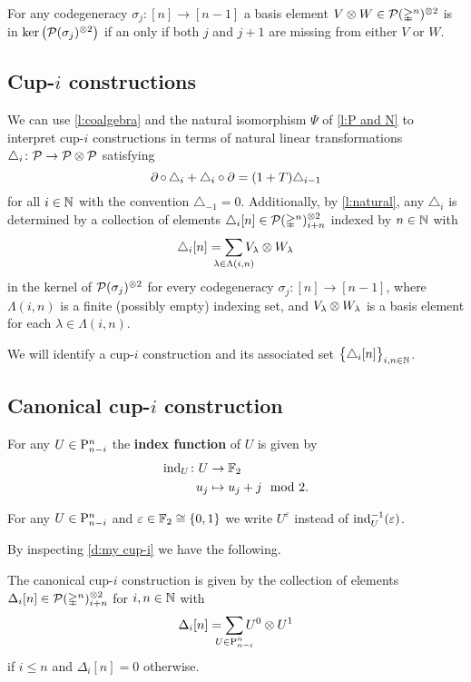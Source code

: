 \begin{lemma} \label{l:kernel of sxs}
	For any codegeneracy $\sigma_j \colon [n] \to [n-1]$ a basis element $V \otimes W \in \mathcal{P}(\mathbb{\Delta}^n)^{\otimes 2}$ is in $\ker \big( \mathcal{P}(\sigma_j)^{\otimes 2} \big)$ if an only if both $j$ and $j+1$ are missing from either $V$ or $W$.
\end{lemma}

\subsection{Cup-$i$ constructions}

We can use \cref{l:coalgebra} and the natural isomorphism $\Psi$ of \cref{l:P and N} to interpret \mbox{cup-$i$} constructions in terms of natural linear transformations $\triangle_i \colon \mathcal{P} \to \mathcal{P} \otimes \mathcal{P}$ satisfying
\[
\operatorname{\partial} \circ \, \triangle_i + \triangle_i \circ \operatorname{\partial} =
(1+T) \triangle_{i-1}
\]
for all $i \in \mathbb{N}$ with the convention $\triangle_{-1} = 0$.
Additionally, by \cref{l:natural}, any $\triangle_i$ is determined by a collection of elements $\triangle_i [n] \in \mathcal{P}(\mathbb{\Delta}^n)^{\otimes 2}_{i+n} $ indexed by $n \in \mathbb{N}$ with
\[
\triangle_i [n] =
\sum_{\mathclap{\lambda \in \Lambda(i,n)}} V_\lambda \ot W_\lambda
\]
in the kernel of $\mathcal{P}(\sigma_j)^{\otimes 2}$ for every codegeneracy $\sigma_j \colon [n] \to [n-1]$,
where $\Lambda(i,n)$ is a finite (possibly empty) indexing set, and $V_\lambda \otimes W_\lambda$ is a basis element for each $\lambda \in \Lambda(i,n)$.

We will identify a \mbox{cup-$i$} construction and its associated set $\big\{ \triangle_i [n] \big\}_{i,n \in \mathbb{N}}$.

\subsection{Canonical \mbox{cup-$i$} construction}

\begin{definition}
	For any $U \in \mathrm{P}^n_{n-i}$ the \textbf{index function} of $U$ is given by
	\[
	\begin{split}
	\operatorname{ind}_U \colon U &\to {\mathbb{F}_2} \\
	u_j &\mapsto u_j + j \mod 2.
	\end{split}
	\]
\end{definition}

\begin{notation*}
	For any $U \in \mathrm{P}^n_{n-i}$ and $\varepsilon \in {\mathbb{F}_2} \cong \{0,1\}$ we write $U^\varepsilon$ instead of $\operatorname{ind}_U^{-1}(\varepsilon)$.
\end{notation*}

By inspecting \cref{d:my cup-i} we have the following.

\begin{lemma} \label{l:canonical}
	The canonical \mbox{cup-$i$} construction is given by the collection of elements $\Delta_i[n] \in \mathcal{P}(\mathbb{\Delta}^n)^{\otimes 2}_{i+n}$ for $i,n \in \mathbb{N}$ with
	\[
	\Delta_i[n] =
	\sum_{\mathclap{U \in \rP^n_{n-i}}} U^0 \ot U^1
	\]
	if $i \leq n$ and $\Delta_i[n] = 0$ otherwise.
\end{lemma}
